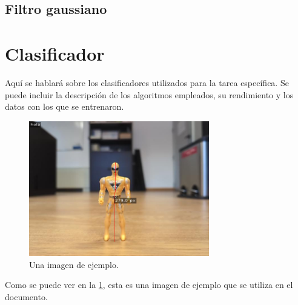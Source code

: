 \documentclass[12pt]{article}
\begin{document}
\subsection{Filtro gaussiano}



\newpage

\section{Clasificador}
Aquí se hablará sobre los clasificadores utilizados para la tarea específica. Se puede incluir la descripción de los algoritmos empleados, su rendimiento y los datos con los que se entrenaron.


\begin{figure}[h!]
    \centering
    \includegraphics[width=0.7\textwidth]{images_calibracion/Altura_objeto.png} 
    \caption{Una imagen de ejemplo.}
    \label{fig:imagen_ejemplo}
\end{figure}

Como se puede ver en la \ref{fig:imagen_ejemplo}, esta es una imagen de ejemplo que se utiliza en el documento.
\end{document}

